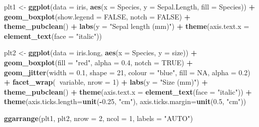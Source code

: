\documentclass[english,10pt,a4paper,oneside]{book}
\newenvironment{Shaded}{\begin{snugshade}}{\end{snugshade}}
\newcommand{\KeywordTok}[1]{\textcolor[rgb]{0.13,0.29,0.53}{\textbf{#1}}}
\newcommand{\DataTypeTok}[1]{\textcolor[rgb]{0.13,0.29,0.53}{#1}}
\newcommand{\DecValTok}[1]{\textcolor[rgb]{0.00,0.00,0.81}{#1}}
\newcommand{\FloatTok}[1]{\textcolor[rgb]{0.00,0.00,0.81}{#1}}
\newcommand{\StringTok}[1]{\textcolor[rgb]{0.31,0.60,0.02}{#1}}
\newcommand{\OtherTok}[1]{\textcolor[rgb]{0.56,0.35,0.01}{#1}}
\newcommand{\OperatorTok}[1]{\textcolor[rgb]{0.81,0.36,0.00}{\textbf{#1}}}
\newcommand{\NormalTok}[1]{#1}
\theoremstyle{definition}
\theoremstyle{definition}
\theoremstyle{definition}
\theoremstyle{remark}
\begin{document}
\begin{Shaded}
\begin{Highlighting}[]
\NormalTok{plt1 <-}\StringTok{ }\KeywordTok{ggplot}\NormalTok{(}\DataTypeTok{data =}\NormalTok{ iris, }\KeywordTok{aes}\NormalTok{(}\DataTypeTok{x =}\NormalTok{ Species, }\DataTypeTok{y =}\NormalTok{ Sepal.Length, }\DataTypeTok{fill =}\NormalTok{ Species)) }\OperatorTok{+}
\StringTok{  }\KeywordTok{geom_boxplot}\NormalTok{(}\DataTypeTok{show.legend =} \OtherTok{FALSE}\NormalTok{, }\DataTypeTok{notch =} \OtherTok{FALSE}\NormalTok{) }\OperatorTok{+}\StringTok{ }\KeywordTok{theme_pubclean}\NormalTok{() }\OperatorTok{+}
\StringTok{  }\KeywordTok{labs}\NormalTok{(}\DataTypeTok{y =} \StringTok{"Sepal length (mm)"}\NormalTok{) }\OperatorTok{+}
\StringTok{  }\KeywordTok{theme}\NormalTok{(}\DataTypeTok{axis.text.x =} \KeywordTok{element_text}\NormalTok{(}\DataTypeTok{face =} \StringTok{"italic"}\NormalTok{))}

\NormalTok{plt2 <-}\StringTok{ }\KeywordTok{ggplot}\NormalTok{(}\DataTypeTok{data =}\NormalTok{ iris.long, }\KeywordTok{aes}\NormalTok{(}\DataTypeTok{x =}\NormalTok{ Species, }\DataTypeTok{y =}\NormalTok{ size)) }\OperatorTok{+}
\StringTok{  }\KeywordTok{geom_boxplot}\NormalTok{(}\DataTypeTok{fill =} \StringTok{"red"}\NormalTok{, }\DataTypeTok{alpha =} \FloatTok{0.4}\NormalTok{, }\DataTypeTok{notch =} \OtherTok{TRUE}\NormalTok{) }\OperatorTok{+}
\StringTok{  }\KeywordTok{geom_jitter}\NormalTok{(}\DataTypeTok{width =} \FloatTok{0.1}\NormalTok{, }\DataTypeTok{shape =} \DecValTok{21}\NormalTok{, }\DataTypeTok{colour =} \StringTok{"blue"}\NormalTok{, }\DataTypeTok{fill =} \OtherTok{NA}\NormalTok{, }\DataTypeTok{alpha =} \FloatTok{0.2}\NormalTok{) }\OperatorTok{+}
\StringTok{  }\KeywordTok{facet_wrap}\NormalTok{(}\OperatorTok{~}\NormalTok{variable, }\DataTypeTok{nrow =} \DecValTok{1}\NormalTok{) }\OperatorTok{+}
\StringTok{  }\KeywordTok{labs}\NormalTok{(}\DataTypeTok{y =} \StringTok{"Size (mm)"}\NormalTok{) }\OperatorTok{+}\StringTok{ }\KeywordTok{theme_pubclean}\NormalTok{() }\OperatorTok{+}
\StringTok{  }\KeywordTok{theme}\NormalTok{(}\DataTypeTok{axis.text.x =} \KeywordTok{element_text}\NormalTok{(}\DataTypeTok{face =} \StringTok{"italic"}\NormalTok{)) }\OperatorTok{+}
\StringTok{  }\KeywordTok{theme}\NormalTok{(}\DataTypeTok{axis.ticks.length=}\KeywordTok{unit}\NormalTok{(}\OperatorTok{-}\FloatTok{0.25}\NormalTok{, }\StringTok{"cm"}\NormalTok{), }\DataTypeTok{axis.ticks.margin=}\KeywordTok{unit}\NormalTok{(}\FloatTok{0.5}\NormalTok{, }\StringTok{"cm"}\NormalTok{))}

\KeywordTok{ggarrange}\NormalTok{(plt1, plt2, }\DataTypeTok{nrow =} \DecValTok{2}\NormalTok{, }\DataTypeTok{ncol =} \DecValTok{1}\NormalTok{, }\DataTypeTok{labels =} \StringTok{"AUTO"}\NormalTok{)}
\end{Highlighting}
\end{Shaded}
\end{document}
